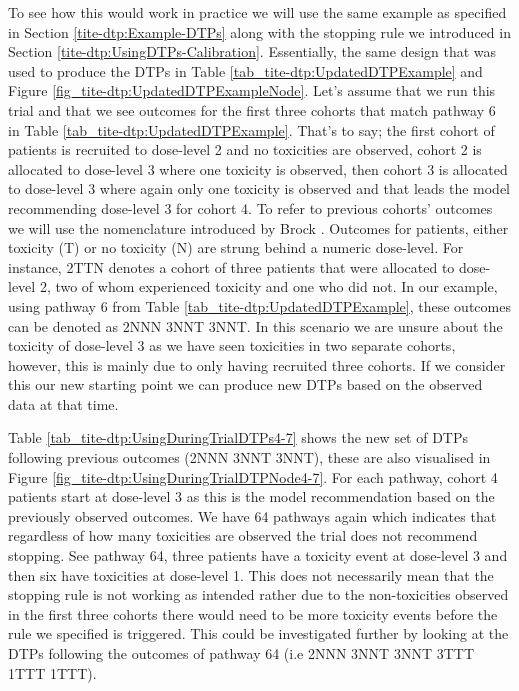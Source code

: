 To see how this would work in practice we will use the same example as specified in Section \ref{tite-dtp:Example-DTPs} along with the stopping rule we introduced in Section \ref{tite-dtp:UsingDTPs-Calibration}. Essentially, the same design that was used to produce the DTPs in Table \ref{tab_tite-dtp:UpdatedDTPExample} and Figure \ref{fig_tite-dtp:UpdatedDTPExampleNode}. Let's assume that we run this trial and that we see outcomes for the first three cohorts that match pathway 6 in Table \ref{tab_tite-dtp:UpdatedDTPExample}. That's to say; the first cohort of patients is recruited to dose-level 2 and no toxicities are observed, cohort 2 is allocated to dose-level 3 where one toxicity is observed, then cohort 3 is allocated to dose-level 3 where again only one toxicity is observed and that leads the model recommending dose-level 3 for cohort 4. To refer to previous cohorts' outcomes we will use the nomenclature introduced by Brock \cite{brockImplementingEffToxDosefinding2017}. Outcomes for patients, either toxicity (T) or no toxicity (N) are strung behind a numeric dose-level. For instance, 2TTN denotes a cohort of three patients that were allocated to dose-level 2, two of whom experienced toxicity and one who did not. In our example, using pathway 6 from Table \ref{tab_tite-dtp:UpdatedDTPExample}, these outcomes can be denoted as 2NNN 3NNT 3NNT. In this scenario we are unsure about the toxicity of dose-level 3 as we have seen toxicities in two separate cohorts, however, this is mainly due to only having recruited three cohorts. If we consider this our new starting point we can produce new DTPs based on the observed data at that time. 

Table \ref{tab_tite-dtp:UsingDuringTrialDTPs4-7} shows the new set of DTPs following previous outcomes (2NNN 3NNT 3NNT), these are also visualised in Figure \ref{fig_tite-dtp:UsingDuringTrialDTPNode4-7}. For each pathway, cohort 4 patients start at dose-level 3 as this is the model recommendation based on the previously observed outcomes. We have 64 pathways again which indicates that regardless of how many toxicities are observed the trial does not recommend stopping. See pathway 64, three patients have a toxicity event at dose-level 3 and then six have toxicities at dose-level 1. This does not necessarily mean that the stopping rule is not working as intended rather due to the non-toxicities observed in the first three cohorts there would need to be more toxicity events before the rule we specified is triggered. This could be investigated further by looking at the DTPs following the outcomes of pathway 64 (i.e 2NNN 3NNT 3NNT 3TTT 1TTT 1TTT). 

